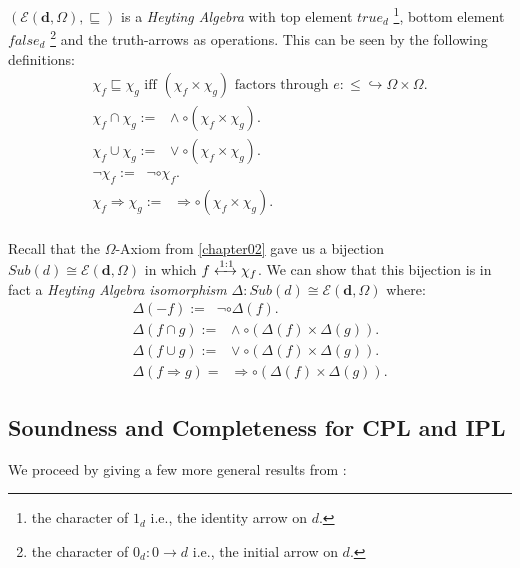 \begin{thm}
	$(\mathcal{E}(\textbf{d},\Omega), \sqsubseteq)$ is a \emph{Heyting Algebra} with top element $true_d$ \footnote{the character of $1_d$ i.e., the identity arrow on $d$. }, bottom element $false_d$ \footnote{the character of $0_d: 0 \rightarrow d$ i.e., the initial arrow on $d$.} and the truth-arrows as operations.
	This can be seen by the following definitions:
	\begin{gather*}
		\chi_f \sqsubseteq \chi_g \text{ iff }(\chi_f \times \chi_g)\text{ factors through }e: \leq \hookrightarrow \Omega \times \Omega. \\
		\chi_f \cap \chi_g :=\;\; \land \circ (\chi_f \times \chi_g). \\
		\chi_f \cup \chi_g :=\;\; \lor \circ (\chi_f \times \chi_g). \\
		\neg\chi_f :=\;\; \neg \circ \chi_f. \\
		\chi_f \Rightarrow \chi_g :=\;\; \Rightarrow \circ (\chi_f \times \chi_g). \\
	\end{gather*}
\end{thm} 
\newpage
Recall that the $\Omega$-Axiom from \ref{chapter02} gave us a bijection $Sub(d) \cong \mathcal{E}(\textbf{d},\Omega)$ in which $f \xleftrightarrow{1:1} \chi_f$.\newline
We can show that this bijection is in fact a \emph{Heyting Algebra isomorphism} $\Delta: Sub(d) \cong \mathcal{E}(\textbf{d},\Omega)$ where: 
\begin{gather*}
	\Delta(-f) :=\;\; \neg \circ \Delta(f). \\
	\Delta(f \cap g) :=\;\; \land \circ (\Delta(f) \times \Delta(g)). \\
	\Delta(f \cup g) :=\;\; \lor \circ (\Delta(f) \times \Delta(g)). \\
	\Delta(f \Rightarrow g) =\;\; \Rightarrow \circ (\Delta(f) \times \Delta(g)). 
\end{gather*}


\newpage
\subsection{Soundness and Completeness for CPL and IPL}

We proceed by giving a few more general results from \cite{goldblatt}:\newline

